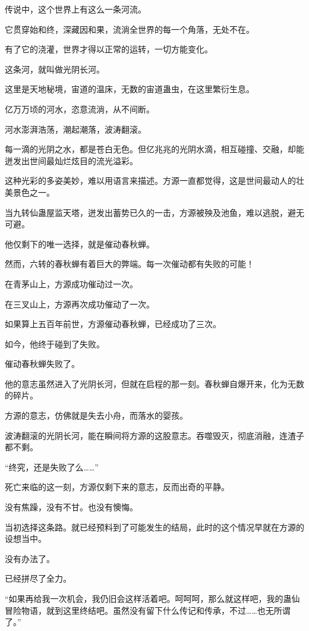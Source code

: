 
\begin{this_body}

传说中，这个世界上有这么一条河流。

它贯穿始和终，深藏因和果，流淌全世界的每一个角落，无处不在。

有了它的浇灌，世界才得以正常的运转，一切方能变化。

这条河，就叫做光阴长河。

这里是天地秘境，宙道的温床，无数的宙道蛊虫，在这里繁衍生息。

亿万万顷的河水，恣意流淌，从不间断。

河水澎湃浩荡，潮起潮落，波涛翻滚。

每一滴的光阴之水，都是苍白无色。但亿兆兆的光阴水滴，相互碰撞、交融，却能迸发出世间最灿烂炫目的流光溢彩。

这种光彩的多姿美妙，难以用语言来描述。方源一直都觉得，这是世间最动人的壮美景色之一。

当九转仙蛊屋监天塔，迸发出蓄势已久的一击，方源被殃及池鱼，难以逃脱，避无可避。

他仅剩下的唯一选择，就是催动春秋蝉。

然而，六转的春秋蝉有着巨大的弊端。每一次催动都有失败的可能！

在青茅山上，方源成功催动过一次。

在三叉山上，方源再次成功催动了一次。

如果算上五百年前世，方源催动春秋蝉，已经成功了三次。

如今，他终于碰到了失败。

催动春秋蝉失败了。

他的意志虽然进入了光阴长河，但就在启程的那一刻。春秋蝉自爆开来，化为无数的碎片。

方源的意志，仿佛就是失去小舟，而落水的婴孩。

波涛翻滚的光阴长河，能在瞬间将方源的这股意志。吞噬毁灭，彻底消融，连渣子都不剩。

“终究，还是失败了么……”

死亡来临的这一刻，方源仅剩下来的意志，反而出奇的平静。

没有焦躁，没有不甘。也没有懊悔。

当初选择这条路。就已经预料到了可能发生的结局，此时的这个情况早就在方源的设想当中。

没有办法了。

已经拼尽了全力。

“如果再给我一次机会，我仍旧会这样活着吧。呵呵呵，那么就这样吧，我的蛊仙冒险物语，就到这里终结吧。虽然没有留下什么传记和传承，不过……也无所谓了。”


\end{this_body}
